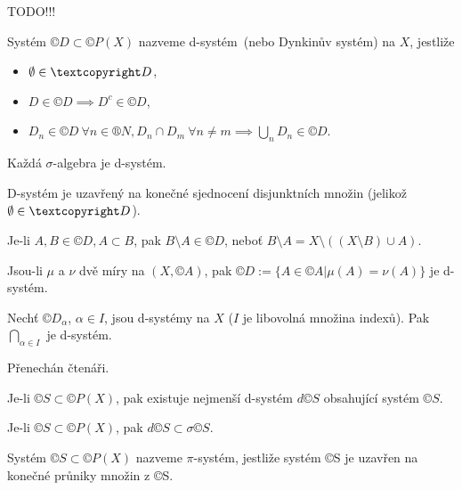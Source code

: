 \documentclass[12pt]{article}					%
\begin{document}

TODO!!!


\begin{definice}
	Systém $©D \subset ©P(X)$ nazveme d-systém (nebo Dynkinův systém) na $X$, jestliže
	
	\begin{itemize}
		\item $\O \in ©D$,
		\item $D \in ©D \implies D^c \in ©D$,
		\item $D_n \in ©D\ \forall n \in ®N, D_n \cap D_m\ \forall n≠m \implies \bigcup_n D_n \in ©D$.

	\end{itemize}
\end{definice}

\begin{poznamka}
	Každá $\sigma$-algebra je d-systém.

	D-systém je uzavřený na konečné sjednocení disjunktních množin (jelikož $\O \in ©D$).

	Je-li $A, B \in ©D, A \subset B$, pak $B \setminus A \in ©D$, neboť $B \setminus A = X \setminus ((X \setminus B) \cup A)$.

	Jsou-li $\mu$ a $\nu$ dvě míry na $(X, ©A)$, pak $©D := \{A \in ©A | \mu(A) = \nu(A)\}$ je d-systém.
\end{poznamka}

\begin{veta}
	Nechť $©D_\alpha$, $\alpha \in I$, jsou d-systémy na $X$ ($I$ je libovolná množina indexů). Pak $\bigcap_{\alpha \in I}$ je d-systém.

	\begin{dukazin}
		Přenechán čtenáři.
	\end{dukazin}
\end{veta}

\begin{dusledek}
	Je-li $©S \subset ©P(X)$, pak existuje nejmenší d-systém $d©S$ obsahující systém $©S$.
\end{dusledek}

\begin{poznamka}
	Je-li $©S \subset ©P(X)$, pak $d©S \subset \sigma©S$.
\end{poznamka}

\begin{definice}
	Systém $©S \subset ©P(X)$ nazveme $\pi$-systém, jestliže systém ©S je uzavřen na konečné průniky množin z ©S.
\end{definice}
\end{document}
